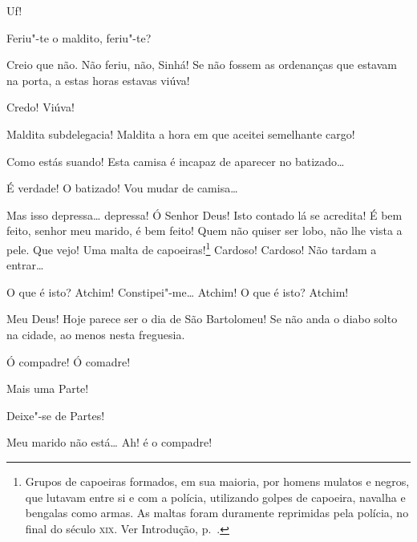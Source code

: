   Uf!

  Feriu"-te o maldito, feriu"-te?

 Creio que não.  Não feriu, não, Sinhá!
Se não fossem as ordenanças que estavam na
porta, a estas horas estavas viúva!

 Credo! Viúva!

 Maldita subdelegacia! Maldita a hora em que aceitei semelhante
cargo!

 Como estás suando! Esta camisa é incapaz de aparecer no
batizado\ldots{}

 É verdade! O batizado! Vou mudar de camisa\ldots{}

 Mas isso depressa\ldots{} depressa!  Ó Senhor Deus! Isto contado lá se acredita!
É bem feito, senhor meu marido, é bem feito! Quem não quiser ser
lobo, não lhe vista a pele.  Que vejo! Uma
malta de capoeiras!\footnote{ Grupos de capoeiras formados, em sua maioria, por homens
mulatos e negros, que lutavam entre si e com a polícia, utilizando golpes de
capoeira, navalha e bengalas como armas. As maltas foram duramente reprimidas
pela polícia, no final do século \textsc{xix}. Ver Introdução, p.~\pageref{capoeira}.} Cardoso! Cardoso! Não
tardam a entrar\ldots{}

  
O que é isto?  Atchim!
Constipei"-me\ldots{} Atchim! O que é isto? Atchim! 




 Meu Deus! Hoje parece ser o dia de São Bartolomeu! Se não anda
o diabo solto na cidade, ao menos
nesta freguesia.

 
Ó compadre! Ó comadre!

 Mais uma Parte!

 Deixe"-se de Partes!

 Meu marido não está\ldots{}  Ah! é o compadre!

